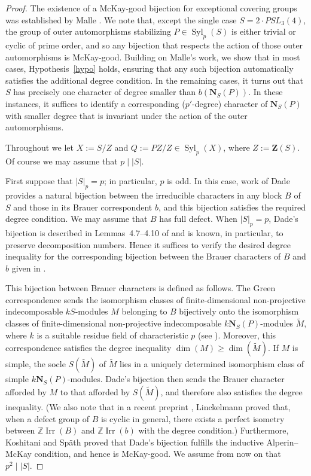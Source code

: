 \documentclass[12pt]{amsart}
\theoremstyle{plain}
\theoremstyle{definition}
\numberwithin{equation}{section}
\newcommand{\Syl}{\operatorname{Syl}}
\newcommand{\Irr}{\operatorname{Irr}}
\newcommand{\bN}{\mathbf{N}}
\newcommand{\ZZ}{{\mathbb Z}}
\newcommand{\bZ}{{\mathbf{Z}}}
\begin{document}
\begin{proof}
The existence of a McKay-good bijection for exceptional covering
groups was established by Malle \cite{Malle08}. We note that, except
the single case $S=2\cdot PSL_3(4)$, the group of outer
automorphisms stabilizing $P\in\Syl_p(S)$ is either trivial or
cyclic of prime order, and so any bijection that respects the action
of those outer automorphisms is McKay-good. Building on Malle's
work, we show that in most cases, Hypothesis~\ref{hypo} holds,
ensuring that any such bijection automatically satisfies the
additional degree condition. In the remaining cases, it turns out
that $S$ has precisely one character of degree smaller than
$b(\bN_S(P))$. In these instances, it suffices to identify a
corresponding ($p'$-degree) character of $\bN_S(P)$ with smaller
degree that is invariant under the action of the outer
automorphisms.

Throughout we let $X:=S/Z$ and $Q:=PZ/Z\in\Syl_p(X)$, where
$Z:=\bZ(S)$. Of course we may assume that $p\mid |S|$.

First suppose that $|S|_p = p$; in particular, $p$ is odd. In this
case, work of Dade \cite{Dade66,Dade96} provides a natural bijection
between the irreducible characters in any block $B$ of $S$ and those
in its Brauer correspondent $b$, and this bijection satisfies the
required degree condition. We may assume that $B$ has full defect.
When $|S|_p=p$, Dade's bijection is described in Lemmas~4.7--4.10 of
\cite{Dade96} and is known, in particular, to preserve decomposition
numbers. Hence it suffices to verify the desired degree inequality
for the corresponding bijection between the Brauer characters of $B$
and $b$ given in \cite[Lemma~4.7]{Dade96}.

This bijection between Brauer characters is defined as follows. The
Green correspondence sends the isomorphism classes of
finite-dimensional non-projective indecomposable $kS$-modules $M$
belonging to $B$ bijectively onto the isomorphism classes of
finite-dimensional non-projective indecomposable $k\bN_S(P)$-modules
$\widetilde{M}$, where $k$ is a suitable residue field of
characteristic $p$ (see \cite[III.5]{Feit82}). Moreover, this
correspondence satisfies the degree inequality $\dim(M)\ge
\dim(\widetilde{M})$. If $M$ is simple, the socle $S(\widetilde{M})$
of $\widetilde{M}$ lies in a uniquely determined isomorphism class
of simple $k\bN_S(P)$-modules. Dade's bijection then sends the
Brauer character afforded by $M$ to that afforded by
$S(\widetilde{M})$, and therefore also satisfies the degree
inequality. (We also note that in a recent preprint \cite{Li25},
Linckelmann proved that, when a defect group of $B$ is cyclic in
general, there exists a perfect isometry between $\ZZ \Irr(B)$ and
$\ZZ \Irr(b)$ with the degree condition.) Furthermore, Koshitani and
Sp\"ath \cite{KS16} proved that Dade's bijection fulfills the
inductive Alperin--McKay condition, and hence is McKay-good. We
assume from now on that $p^2\mid |S|$.


\end{proof}
\end{document}
